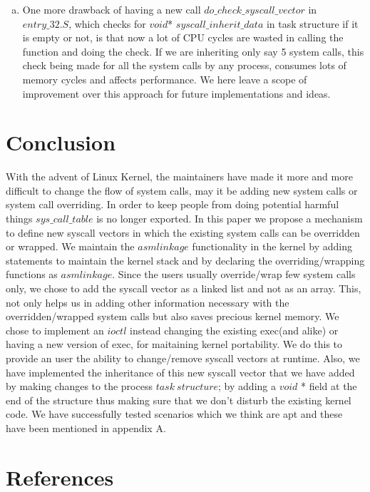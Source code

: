 \documentclass[11pt]{article}
\begin{document}
\begin{enumerate}[(a)]
\item
One more drawback of having a new call $do\_check\_syscall\_vector$ in $entry\_32.S$, which checks for $void$* $syscall\_inherit\_data$ in task structure if it is empty or not, is that now a lot of CPU cycles are wasted in calling the function and doing the check. If we are inheriting only say 5 system calls, this check being made for all the system calls by any process, consumes lots of memory cycles and affects performance. We here leave a scope of improvement over this approach for future implementations and ideas.

\end{enumerate}

\section{Conclusion}

With the advent of Linux Kernel, the maintainers have made it more and more difficult to change the flow of system calls, may it be adding new system calls or system call overriding.  In order to keep people from doing potential harmful things $sys\_call\_table$ is no longer exported. In this paper we propose a mechanism to define new syscall vectors in which the existing system calls can be overridden or wrapped. We maintain the $asmlinkage$ functionality in the kernel by adding statements to maintain the kernel stack and by declaring the overriding/wrapping functions as $asmlinkage$. Since the users usually override/wrap few system calls only, we chose to add the syscall vector as a linked list and not as an array. This, not only helps us in adding other information necessary with the overridden/wrapped system calls but also saves precious kernel memory. We chose to implement an $ioctl$ instead changing the existing exec(and alike) or having a new version of exec, for maitaining kernel portability. We do this to provide an user the ability to change/remove syscall vectors at runtime. Also, we have implemented the inheritance of this new syscall vector that we have added by making changes to the process $task\ structure$; by adding a $void$ * field at the end of the structure thus making sure that we don't disturb the existing kernel code. We have successfully tested scenarios which we think are apt and these have been mentioned in appendix A.  


\section{References}
\end{document}
